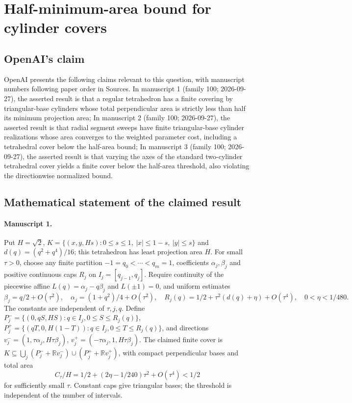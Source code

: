 \documentclass[11pt]{article}
\begin{document}
\section*{Half-minimum-area bound for cylinder covers}

\subsection{OpenAI's claim}
OpenAI presents the following claims relevant to this question, with manuscript numbers following paper order in Sources. In manuscript 1 (family 100; 2026-09-27), the asserted result is that a regular tetrahedron has a finite covering by triangular-base cylinders whose total perpendicular area is strictly less than half its minimum projection area; In manuscript 2 (family 100; 2026-09-27), the asserted result is that radial segment sweeps have finite triangular-base cylinder realizations whose area converges to the weighted parameter cost, including a tetrahedral cover below the half-area bound; In manuscript 3 (family 100; 2026-09-27), the asserted result is that varying the axes of the standard two-cylinder tetrahedral cover yields a finite cover below the half-area threshold, also violating the directionwise normalized bound.

\subsection{Mathematical statement of the claimed result}
\paragraph{Manuscript 1.}
Put $H=\sqrt2$, $K=\{(x,y,Hs):0\le s\le1,\ |x|\le1-s,\ |y|\le s\}$ and $d(q)=(q^2+q^4)/16$; this tetrahedron has least projection area $H$. For small $\tau>0$, choose any finite partition $-1=q_0<\cdots<q_m=1$, coefficients $\alpha_j,\beta_j$ and positive continuous caps $R_j$ on $I_j=[q_{j-1},q_j]$. Require continuity of the piecewise affine $L(q)=\alpha_j-q\beta_j$ and $L(\pm1)=0$, and uniform estimates
\[
 \beta_j=q/2+O(\tau^2),\quad\alpha_j=(1+q^2)/4+O(\tau^2),\quad
 R_j(q)=1/2+\tau^2(d(q)+\eta)+O(\tau^4),\quad0<\eta<1/480.
\]
The constants are independent of $\tau,j,q$. Define $P_j^-=\{(0,qS,HS):q\in I_j,0\le S\le R_j(q)\}$, $P_j^+=\{(qT,0,H(1-T)):q\in I_j,0\le T\le R_j(q)\}$, and directions $v_j^-=(1,\tau\alpha_j,H\tau\beta_j)$, $v_j^+=(-\tau\alpha_j,1,H\tau\beta_j)$. The claimed finite cover is $K\subseteq\bigcup_j(P_j^-+\mathbb Rv_j^-)\cup(P_j^++\mathbb Rv_j^+)$, with compact perpendicular bases and total area
\[
 C_{\tau}/H=1/2+(2\eta-1/240)\tau^2+O(\tau^4)<1/2
\]
for sufficiently small $\tau$. Constant caps give triangular bases; the threshold is independent of the number of intervals.
\end{document}
